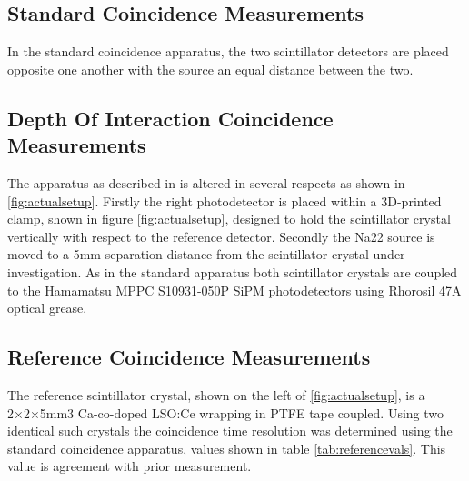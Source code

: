 \subsection{Standard Coincidence Measurements}
In the standard coincidence apparatus, the two scintillator detectors are placed opposite one another with the source an equal distance between the two.

\subsection{Depth Of Interaction Coincidence Measurements}
The apparatus as described in \cite{arron_Meyer_Pauwels_Lecoq_2012} is altered in several respects as shown in \ref{fig:actualsetup}. Firstly the right photodetector is placed within a 3D-printed clamp, shown in figure \ref{fig:actualsetup}, designed to hold the scintillator crystal vertically with respect to the reference detector. Secondly the Na22 source is moved to a 5mm separation distance from the scintillator crystal under investigation. As in the standard apparatus both scintillator crystals are coupled to the Hamamatsu MPPC S10931-050P SiPM photodetectors using Rhorosil 47A optical grease. 

\subsection{Reference Coincidence Measurements}
The reference scintillator crystal, shown on the left of \ref{fig:actualsetup}, is a 2×2×5mm3 Ca-co-doped LSO:Ce wrapping in PTFE tape coupled. Using two identical such crystals the coincidence time resolution was determined using the standard coincidence apparatus, values shown in table \ref{tab:referencevals}. This value is agreement with prior measurement\cite{arron_Meyer_Pauwels_Lecoq_2012}.